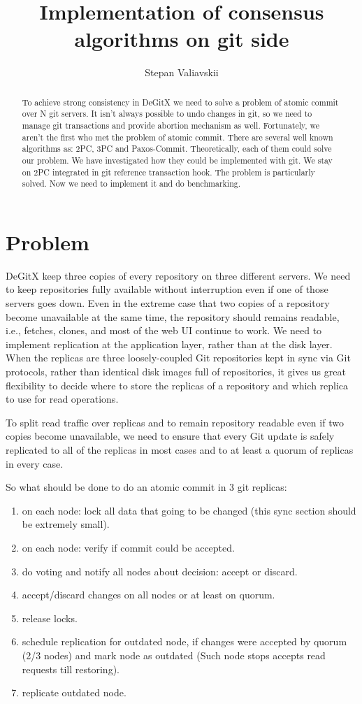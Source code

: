 \documentclass[acmlarge, screen, nonacm]{acmart}
\title{Implementation of consensus algorithms on git side}
\author{Stepan Valiavskii}
\begin{document}
\begin{abstract}
To achieve strong consistency in DeGitX we need to solve a problem of atomic commit over N git servers.
It isn't always possible to undo changes in git, so we need to manage git transactions and provide abortion mechanism as well.
Fortunately, we aren't the first who met the problem of atomic commit.
There are several well known algorithms as: 2PC, 3PC and Paxos-Commit.
Theoretically, each of them could solve our problem.
We have investigated how they could be implemented with git.
We stay on 2PC integrated in git reference transaction hook.
The problem is particularly solved.
Now we need to implement it and do benchmarking.
\end{abstract}

\maketitle

\section{Problem}

DeGitX keep three copies of every repository on three different servers.
We need to keep repositories fully
available without interruption even if one of those servers goes down.
Even in the extreme case that two copies of a repository become unavailable at
the same time, the repository should remains readable, i.e., fetches, clones, and
most of the web UI continue to work.
We need to implement replication at the application layer, rather than at the disk layer.
When the replicas are three loosely-coupled Git repositories kept
in sync via Git protocols, rather than identical disk images full of repositories,
it gives us great flexibility to decide where to
store the replicas of a repository and which replica to use for read operations.

To split read traffic over replicas and to remain repository readable even if two copies become unavailable,
we need to ensure that every Git update is safely replicated to all of the replicas in most cases
and to at least a quorum of replicas in every case.

So what should be done to do an atomic commit in 3 git replicas:
\begin{enumerate}
  \item on each node: lock all data that going to be changed (this sync section should be extremely small).
  \item on each node: verify if commit could be accepted.
  \item do voting and notify all nodes about decision: accept or discard.
  \item accept/discard changes on all nodes or at least on quorum.
  \item release locks.
  \item schedule replication for outdated node, if changes were accepted by quorum (2/3 nodes) and mark node as outdated (Such node stops accepts read requests till restoring).
  \item replicate outdated node.
\end{enumerate}
\end{document}
